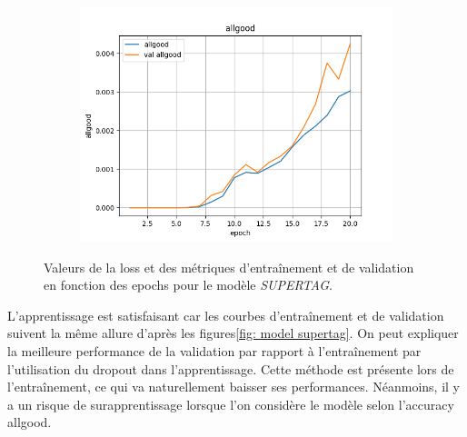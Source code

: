\documentclass[a4paper]{article}
\begin{document}
\begin{figure}[H]
\begin{subfigure}{0.32\textwidth}
    \end{subfigure}
    \begin{subfigure}{0.32\textwidth}
        \centering
        \includegraphics[width=\linewidth]{../logs/supertag/allgood.png}
    \end{subfigure}
    \caption{Valeurs de la loss et des métriques d'entraînement et de validation en fonction des epochs 
            pour le modèle \textit{SUPERTAG}.}
    \label{fig: results supertag}
\end{figure}

L'apprentissage est satisfaisant car les courbes d'entraînement et de validation suivent la même allure d'après les figures\ref{fig: model supertag}. 
On peut expliquer la meilleure performance
de la validation par rapport à l'entraînement par l'utilisation du dropout dans l'apprentissage. Cette méthode est présente lors
de l'entraînement, ce qui va naturellement baisser ses performances. 
Néanmoins, il y a un risque de surapprentissage lorsque l'on considère le modèle selon l'accuracy allgood. 
\end{document}
